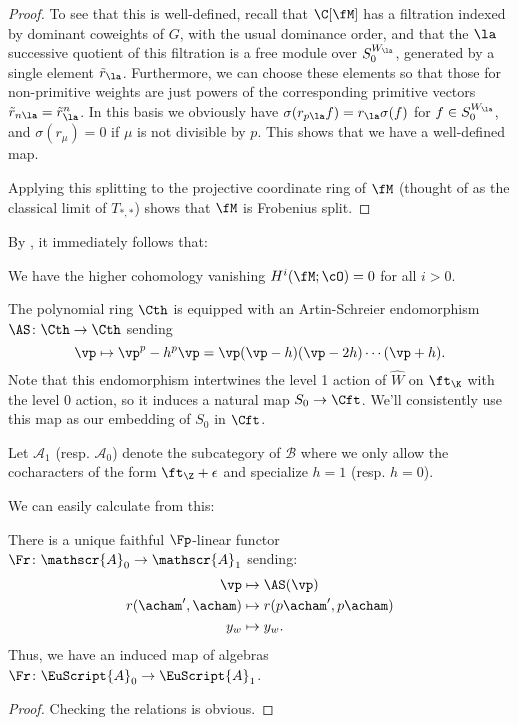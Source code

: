 {\begin{proof}
To see that this is well-defined, recall that $\C[\fM]$ has a filtration indexed by dominant coweights of $G$, with the usual dominance order, and that the $\la$ successive quotient of this filtration is a free module over $S_0^{W_\la}$, generated by a single element $\tilde{r}_{\la}$.  Furthermore, we can choose these elements so that those for non-primitive weights are just powers of the corresponding primitive vectors $\tilde{r}_{n\la}=\tilde{r}_{\la}^n$.  In this basis we obviously have $\sigma(r_{p\la}f)=r_{\la}\sigma(f)$ for $f\in S_0^{W_\la}$, and $\sigma(r_\mu)=0$ if $\mu$ is not divisible by $p$.   This shows that we have a well-defined map.

Applying this splitting to the projective coordinate ring of $\fM$ (thought of as the classical limit of $T_{*,*}$) shows that $\fM$ is Frobenius split.  
\end{proof}
By \cite[Thm. 1.1]{MR1156382}, it immediately follows that:
\begin{corollary}\label{cor:cohomology-vanishing}
We have the higher cohomology vanishing $H^i(\fM;\cO)=0$ for all $i>0$.
\end{corollary}


The polynomial ring $\Cth$ is equipped with an Artin-Schreier endomorphism $\AS\colon \Cth\to \Cth$ sending \[\vp\mapsto \vp^p-h^p\vp=\vp(\vp-h) (\vp-2h)\cdots (\vp+h).\]  Note that this endomorphism intertwines the level 1 action of $\hat {W}$ on $\ft_{\K}$ with the level 0 action, so it induces a natural map $S_0\to \Cft$.  We'll consistently use this map as our embedding of $S_0$ in $\Cft$.


Let $\mathscr{A}_1$ (resp. $\mathscr{A}_0$) denote the subcategory of $\mathscr{B}$ where we only allow the cocharacters of the form $\ft_\Z+\epsilon$ and specialize $h=1$ (resp. $h=0$).

We can easily calculate from this:
\begin{theorem}
There is a unique faithful $\Fp$-linear functor $\Fr\colon\mathscr{A}_0\to \mathscr{A}_1$ sending:
\begin{align}
    \vp &\mapsto \AS(\vp)\\
    r(\acham',\acham)&\mapsto r(p\acham',p\acham)\\
    y_w&\mapsto y_w.
\end{align} 
Thus, we have an induced map of algebras $\Fr\colon\EuScript{A}_0\to \EuScript{A}_1$.
\end{theorem}
\begin{proof}
Checking the relations is obvious.  
\end{proof}

}
